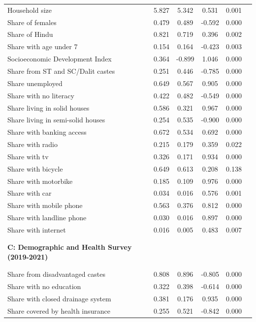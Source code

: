 {\begin{tabular}{lccccc}
Household size & 5.827 & 5.342 & 0.531 & 0.001 & \\
Share of females & 0.479 & 0.489 & -0.592 & 0.000 & \\
Share of Hindu & 0.821 & 0.719 & 0.396 & 0.002 & \\
Share with age under 7 & 0.154 & 0.164 & -0.423 & 0.003 & \\
Socioeconomic Development Index & 0.364 & -0.899 & 1.046 & 0.000 & \\
Share from ST and SC/Dalit castes & 0.251 & 0.446 & -0.785 & 0.000 & \\
Share unemployed & 0.649 & 0.567 & 0.905 & 0.000 & \\
Share with no literacy & 0.422 & 0.482 & -0.549 & 0.000 & \\
Share living in solid houses & 0.586 & 0.321 & 0.967 & 0.000 & \\
Share living in semi-solid houses & 0.254 & 0.535 & -0.900 & 0.000 & \\
Share with banking access & 0.672 & 0.534 & 0.692 & 0.000 & \\
Share with radio & 0.215 & 0.179 & 0.359 & 0.022 & \\
Share with tv & 0.326 & 0.171 & 0.934 & 0.000 & \\
Share with bicycle & 0.649 & 0.613 & 0.208 & 0.138 & \\
Share with motorbike & 0.185 & 0.109 & 0.976 & 0.000 & \\
Share with car & 0.034 & 0.016 & 0.576 & 0.001 & \\
Share with mobile phone & 0.563 & 0.376 & 0.812 & 0.000 & \\
Share with landline phone & 0.030 & 0.016 & 0.897 & 0.000 & \\
Share with internet & 0.016 & 0.005 & 0.483 & 0.007 & \\
\hline \\[-5.1ex] &  &  &  &  & \\
 \textbf{C: Demographic and Health Survey (2019-2021)} &  &  &  &  & \\
 &  &  &  &  & \\[-5ex]\\
Share from disadvantaged castes       &           0.808  &     0.896    &    -0.805    &    0.000 & \\
Share with no education & 0.322 & 0.398 & -0.614 & 0.000 & \\
Share with closed drainage system & 0.381 & 0.176 & 0.935 & 0.000 & \\
Share covered by health insurance & 0.255 & 0.521 & -0.842 & 0.000 & \\

\end{tabular}}
